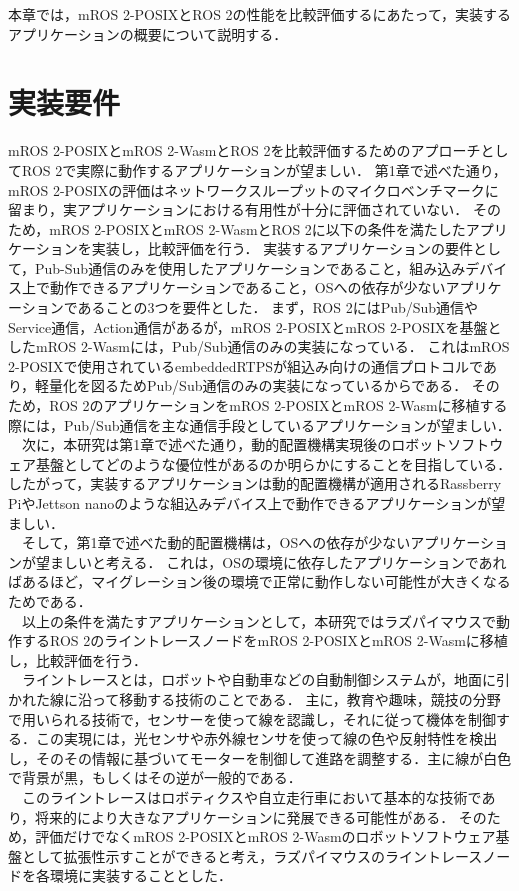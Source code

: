 \noindent 本章では，mROS 2-POSIXとROS 2の性能を比較評価するにあたって，実装するアプリケーションの概要について説明する．
\section{実装要件}
mROS 2-POSIXとmROS 2-WasmとROS 2を比較評価するためのアプローチとしてROS 2で実際に動作するアプリケーションが望ましい．
第1章で述べた通り，mROS 2-POSIXの評価はネットワークスループットのマイクロベンチマークに留まり，実アプリケーションにおける有用性が十分に評価されていない．
そのため，mROS 2-POSIXとmROS 2-WasmとROS 2に以下の条件を満たしたアプリケーションを実装し，比較評価を行う．
実装するアプリケーションの要件として，Pub-Sub通信のみを使用したアプリケーションであること，組み込みデバイス上で動作できるアプリケーションであること，OSへの依存が少ないアプリケーションであることの3つを要件とした．
まず，ROS 2にはPub/Sub通信やService通信，Action通信があるが，mROS 2-POSIXとmROS 2-POSIXを基盤としたmROS 2-Wasmには，Pub/Sub通信のみの実装になっている．
これはmROS 2-POSIXで使用されているembeddedRTPSが組込み向けの通信プロトコルであり，軽量化を図るためPub/Sub通信のみの実装になっているからである．
そのため，ROS 2のアプリケーションをmROS 2-POSIXとmROS 2-Wasmに移植する際には，Pub/Sub通信を主な通信手段としているアプリケーションが望ましい．
\\　次に，本研究は第1章で述べた通り，動的配置機構実現後のロボットソフトウェア基盤としてどのような優位性があるのか明らかにすることを目指している．
したがって，実装するアプリケーションは動的配置機構が適用されるRassberry PiやJettson nanoのような組込みデバイス上で動作できるアプリケーションが望ましい．
\\　そして，第1章で述べた動的配置機構は，OSへの依存が少ないアプリケーションが望ましいと考える．
これは，OSの環境に依存したアプリケーションであればあるほど，マイグレーション後の環境で正常に動作しない可能性が大きくなるためである．
\\　以上の条件を満たすアプリケーションとして，本研究ではラズパイマウスで動作するROS 2のライントレースノードをmROS 2-POSIXとmROS 2-Wasmに移植し，比較評価を行う．
\\　ライントレースとは，ロボットや自動車などの自動制御システムが，地面に引かれた線に沿って移動する技術のことである．
主に，教育や趣味，競技の分野で用いられる技術で，センサーを使って線を認識し，それに従って機体を制御する．この実現には，光センサや赤外線センサを使って線の色や反射特性を検出し，そのその情報に基づいてモーターを制御して進路を調整する．主に線が白色で背景が黒，もしくはその逆が一般的である．
\\　このライントレースはロボティクスや自立走行車において基本的な技術であり，将来的により大きなアプリケーションに発展できる可能性がある．
そのため，評価だけでなくmROS 2-POSIXとmROS 2-Wasmのロボットソフトウェア基盤として拡張性示すことができると考え，ラズパイマウスのライントレースノードを各環境に実装することとした．
